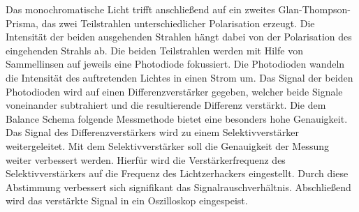Das monochromatische Licht trifft anschließend auf ein zweites Glan-Thompson-Prisma,
das zwei Teilstrahlen unterschiedlicher Polarisation erzeugt.
Die Intensität der beiden ausgehenden Strahlen hängt dabei von der Polarisation des eingehenden Strahls ab.
Die beiden Teilstrahlen werden mit Hilfe von Sammellinsen auf jeweils eine Photodiode fokussiert.
Die Photodioden wandeln die Intensität des auftretenden Lichtes in einen Strom um.
Das Signal der beiden Photodioden wird auf einen Differenzverstärker gegeben, welcher
beide Signale voneinander subtrahiert und die resultierende Differenz verstärkt.
Die dem Balance Schema folgende Messmethode bietet eine besonders hohe Genauigkeit.
Das Signal des Differenzverstärkers wird zu einem Selektivverstärker weitergeleitet.
Mit dem Selektivverstärker soll die Genauigkeit der Messung weiter verbessert werden.
Hierfür wird die Verstärkerfrequenz des Selektivverstärkers auf die Frequenz des
Lichtzerhackers eingestellt.
Durch diese Abstimmung verbessert sich signifikant das Signalrauschverhältnis.
Abschließend wird das verstärkte Signal in ein Oszilloskop eingespeist.

